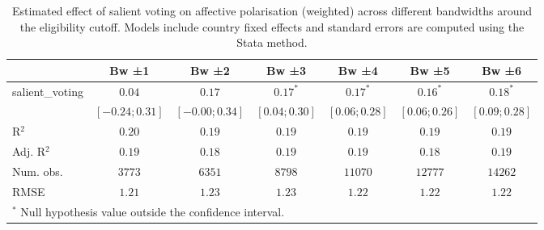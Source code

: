 
\begin{table}
\begin{center}
\begin{tabular}{l c c c c c c}
\hline
 & Bw ±1 & Bw ±2 & Bw ±3 & Bw ±4 & Bw ±5 & Bw ±6 \\
\hline
salient\_voting & $0.04$           & $0.17$           & $0.17^{*}$      & $0.17^{*}$      & $0.16^{*}$      & $0.18^{*}$      \\
                & $ [-0.24; 0.31]$ & $ [-0.00; 0.34]$ & $ [0.04; 0.30]$ & $ [0.06; 0.28]$ & $ [0.06; 0.26]$ & $ [0.09; 0.28]$ \\
\hline
R$^2$           & $0.20$           & $0.19$           & $0.19$          & $0.19$          & $0.19$          & $0.19$          \\
Adj. R$^2$      & $0.19$           & $0.18$           & $0.19$          & $0.19$          & $0.18$          & $0.19$          \\
Num. obs.       & $3773$           & $6351$           & $8798$          & $11070$         & $12777$         & $14262$         \\
RMSE            & $1.21$           & $1.23$           & $1.23$          & $1.22$          & $1.22$          & $1.22$          \\
\hline
\multicolumn{7}{l}{\scriptsize{$^*$ Null hypothesis value outside the confidence interval.}}
\end{tabular}
\caption{Estimated effect of salient voting on affective polarisation (weighted) across different bandwidths around the eligibility cutoff. Models include country fixed effects and standard errors are computed using the Stata method.}
\label{table:coefficients_w}
\end{center}
\end{table}
